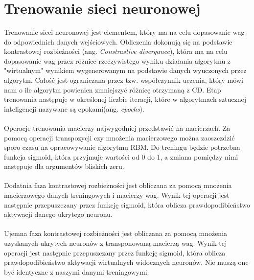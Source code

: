 \section{Trenowanie sieci neuronowej}
    \paragraph{}
        Trenowanie sieci neuronowej jest elementem, który ma na celu dopasowanie wag do odpowiednich danych wejściowych.
        Obliczenia dokonują się na podstawie kontrastowej rozbieżności (ang. \textit{Constrastive divergance}), która ma na celu
        dopasowanie wag przez różnice rzeczywistego wyniku działania algorytmu z "wirtualnym" wynikiem wygenerowanym na
        podstawie danych wyuczonych przez algorytm. Całość jest ograniczana przez tzw. współczynnik uczenia, który mówi
        nam o ile algorytm powienien zmniejszyć różnicę otrzymaną z CD. Etap trenowania następuje w określonej liczbie iteracji,
        które w algorytmach sztucznej inteligencji nazywane są epokami(ang. \textit{epochs}).

    \paragraph{}
       Operacje trenowania macierzy najwygodniej przedstawić na macierzach. Za pomocą operacji transpozycji czy mnożenia
       macierzowego można zaoszczdzić sporo czasu na opracowywanie algorytmu RBM. Do treningu będzie potrzebna funkcja sigmoid,
       która przyjmuje wartości od 0 do 1,  a zmiana pomiędzy nimi następuje dla argumentów bliskich zeru.

    \paragraph{}
	 Dodatnia faza kontrastowej rozbieżności jest obliczana za pomocą mnożenia macierzowego danych treningowych i macierzy wag.
	 Wynik tej operacji jest następnie przepuszczany przez funkcję sigmoid, która oblicza prawdopodibieństwo aktywacji danego ukrytego neuronu.

    \paragraph{}
	 Ujemna faza kontrastowej rozbieżności jest obliczana za pomocą mnożenia uzyskanych ukrytych neuronów z transponowaną
	 macierzą wag. Wynik tej operacji jest następnie przepuszczany przez funkcję sigmoid, która oblicza prawdopodibieństwo aktywacji
     wirtualnych widocznych neuronów. Nie muszą one być identyczne z naszymi danymi treningowymi.

